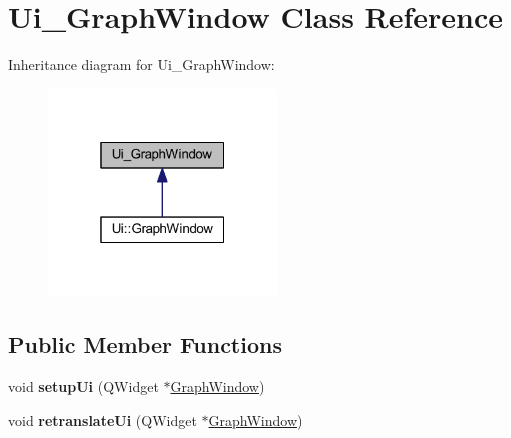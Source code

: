 \hypertarget{class_ui___graph_window}{}\section{Ui\+\_\+\+Graph\+Window Class Reference}
\label{class_ui___graph_window}


Inheritance diagram for Ui\+\_\+\+Graph\+Window\+:\nopagebreak
\begin{figure}[H]
\begin{center}
\leavevmode
\includegraphics[width=172pt]{class_ui___graph_window__inherit__graph}
\end{center}
\end{figure}
\subsection*{Public Member Functions}
\begin{DoxyCompactItemize}
\item 
\mbox{\label{class_ui___graph_window_ae2b9a1610f761623bf96ea96e6559e55}} 
void {\bfseries setup\+Ui} (Q\+Widget $\ast$\mbox{\hyperlink{class_graph_window}{Graph\+Window}})
\item 
\mbox{\label{class_ui___graph_window_a113213fb6282f8648a73ef86447292b2}} 
void {\bfseries retranslate\+Ui} (Q\+Widget $\ast$\mbox{\hyperlink{class_graph_window}{Graph\+Window}})
\end{DoxyCompactItemize}
